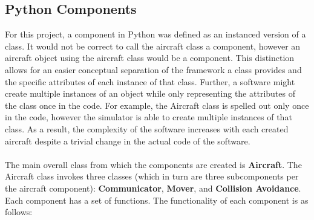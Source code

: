 \documentclass[12pt]{report}
\theoremstyle{plain}
\theoremstyle{definition}
\begin{document}
\subsection*{Python Components}
For this project, a component in Python was defined as an instanced version of a class.  It would not be correct to call the aircraft class a component, however an aircraft object using the aircraft class would be a component.  This distinction allows for an easier conceptual separation of the framework a class provides and the specific attributes of each instance of that class. Further, a software might create multiple instances of an object while only representing the attributes of the class once in the code.  For example, the Aircraft class is spelled out only once in the code, however the simulator is able to create multiple instances of that class.  As a result, the complexity of the software increases with each created aircraft despite a trivial change in the actual code of the software.\\
\\
The main overall class from which the components are created is \textbf{Aircraft}.  The Aircraft class invokes three classes (which in turn are three subcomponents per the aircraft component): \textbf{Communicator}, \textbf{Mover}, and \textbf{Collision Avoidance}.  Each component has a set of functions.  The functionality of each component is as follows:
\end{document}
